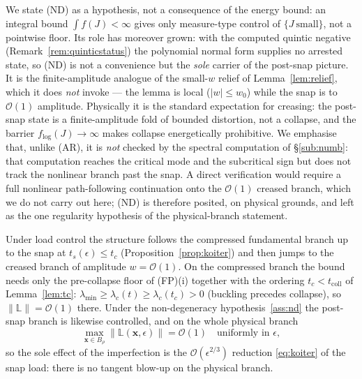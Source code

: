 \noindent We state (ND) as a hypothesis, not a consequence of the energy bound: an integral bound $\int f(J)<\infty$
gives only measure-type control of $\{J\ \text{small}\}$, not a pointwise floor. Its role has moreover grown: with
the computed quintic negative (Remark~\ref{rem:quinticstatus}) the polynomial normal form supplies no arrested state,
so (ND) is not a convenience but the \emph{sole} carrier of the post-snap picture. It is the finite-amplitude analogue of
the small-$w$ relief of Lemma~\ref{lem:relief}, which it does \emph{not} invoke --- the lemma is local ($|w|\le w_0$)
while the snap is to $\mathcal{O}(1)$ amplitude. Physically it is the standard expectation for creasing: the post-snap
state is a finite-amplitude fold of bounded distortion, not a collapse, and the barrier $f_{\log}(J)\to\infty$ makes
collapse energetically prohibitive. We emphasise that, unlike (AR), it is \emph{not} checked by the spectral computation
of \S\ref{sub:numb}: that computation reaches the critical mode and the subcritical sign but does not track the
nonlinear branch past the snap. A direct verification would require a full nonlinear path-following continuation onto the
$\mathcal{O}(1)$ creased branch, which we do not carry out here; (ND) is therefore posited, on physical grounds, and
left as the one regularity hypothesis of the physical-branch statement.

\begin{proposition}
    \label{prop:physical}
    Under load control the structure follows the compressed fundamental branch up to the snap at $t_s(\epsilon)\le t_c$
    (Proposition~\ref{prop:koiter}) and then jumps to the creased branch of amplitude $w=\mathcal{O}(1)$. On the
    compressed branch the bound needs only the pre-collapse floor of (FP)(i) together with the ordering
    $t_c<t_{\mathrm{coll}}$ of Lemma~\ref{lem:tc}: $\lambda_{\min}\ge\lambda_c(t)\ge\lambda_c(t_c)>0$ (buckling
    precedes collapse), so $\|\mathbb{L}\|=\mathcal{O}(1)$ there. Under the non-degeneracy hypothesis~\ref{ass:nd} the post-snap
    branch is likewise controlled, and on the whole physical branch
    \begin{equation}
        \max_{\bm{x}\in B_\rho}\|\mathbb{L}(\bm{x},\epsilon)\| = \mathcal{O}(1) \quad\text{uniformly in } \epsilon,
    \end{equation}
    so the sole effect of the imperfection is the $\mathcal{O}(\epsilon^{2/3})$ reduction \eqref{eq:koiter} of the snap
    load: there is no tangent blow-up on the physical branch.
\end{proposition}

